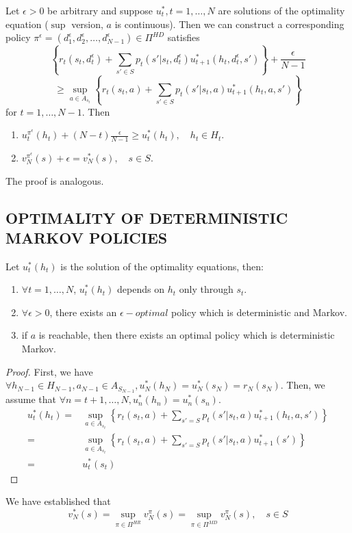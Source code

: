 \begin{theorem}
    Let $ \epsilon > 0 $ be arbitrary and suppose $ u^*_t, t = 1, \ldots, N $ are solutions of the optimality equation ($ \sup $ version, $ a $ is continuous). 
    Then we can construct a corresponding policy $ \pi^\epsilon  = (d^\epsilon_1, d^\epsilon_2, \ldots, d^\epsilon_{N-1}) \in \Pi^{HD}$ satisfies
    \[
        \left\{ r_t(s_t, d^\epsilon_t) + \sum^{}_{s' \in S} p_t(s' | s_t, d^\epsilon_t) u^*_{t+1}(h_t, d^\epsilon_t, s') \right\} + \frac{\epsilon}{N-1} 
    \]
    \[
        \ge \sup_{a \in A_{s_t}} \left\{ r_t(s_t, a) + \sum^{}_{s' \in S} p_t(s' | s_t, a) u^*_{t+1}(h_t, a, s') \right\}
    \]
    for $ t = 1, \ldots, N-1 $.
    Then
    \begin{enumerate}
        \item $ u^{\pi^\epsilon}_t(h_t) + (N-t) \frac{\epsilon}{N-1} \ge u^*_t(h_t), \quad h_t \in H_t $.
        \item $ v^{\pi^\epsilon}_N(s) + \epsilon = v^*_N(s) , \quad s \in S$.
    \end{enumerate}
    The proof is analogous.
\end{theorem}

\subsection{OPTIMALITY OF DETERMINISTIC MARKOV POLICIES}%
\label{sub:optimality_of_deterministic_markov_policies}

\begin{theorem}
    Let $ u^*_t (h_t)$ is the solution of the optimality equations, then:
    \begin{enumerate}
        \item $ \forall t = 1, \ldots, N $, $ u^*_t(h_t) $ depends on $ h_t $ only through $ s_t $.
        \item $ \forall \epsilon > 0 $, there exists an $ \epsilon-optimal $ policy which is deterministic and Markov.
        \item if $ a $ is reachable, then there exists an optimal policy which is deterministic Markov.
    \end{enumerate}
    \begin{proof}
        First, we have $\forall h_{N-1} \in H_{N-1}, a_{N-1} \in A_{S_{N-1}}, u^*_N(h_N) = u^*_N(s_N) = r_N(s_N) $.  
        Then, we assume that $ \forall n = t+1, \ldots, N, u^*_n(h_n) = u^*_n(s_n) $.
        \begin{align*}
            u^*_t(h_t) =& \sup_{a \in A_{s_t}} \left\{ r_t(s_t, a) + \sum^{}_{s' = S} p_t(s' | s_t, a) u^*_{t+1}(h_t, a, s') \right\} \\
            =& \sup_{a \in A_{s_t}} \left\{ r_t(s_t, a) + \sum^{}_{s' = S} p_t(s' | s_t, a) u^*_{t+1}(s') \right\} \\
            =& u^*_t(s_t)
        \end{align*}
    \end{proof}
\end{theorem}
We have established that
\[
    v^*_N(s) = \sup_{\pi \in \Pi^{HR}} v^\pi_N(s) = \sup_{\pi \in \Pi^{MD}} v^\pi_{N}(s), \quad s \in S
\]

